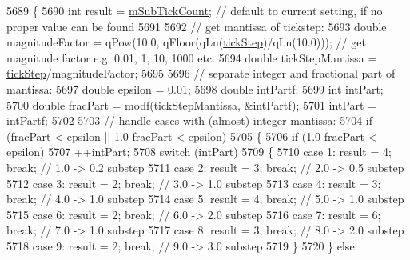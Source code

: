 \begin{DoxyCode}
5689 \{
5690   \textcolor{keywordtype}{int} result = \hyperlink{class_q_c_p_axis_ad70198e6ae2801fc409bc3caec707da9}{mSubTickCount}; \textcolor{comment}{// default to current setting, if no proper value can be found}
5691   
5692   \textcolor{comment}{// get mantissa of tickstep:}
5693   \textcolor{keywordtype}{double} magnitudeFactor = qPow(10.0, qFloor(qLn(\hyperlink{class_q_c_p_axis_a0e6120d24266544441ab691f316a1b03}{tickStep})/qLn(10.0))); \textcolor{comment}{// get magnitude factor
       e.g. 0.01, 1, 10, 1000 etc.}
5694   \textcolor{keywordtype}{double} tickStepMantissa = \hyperlink{class_q_c_p_axis_a0e6120d24266544441ab691f316a1b03}{tickStep}/magnitudeFactor;
5695   
5696   \textcolor{comment}{// separate integer and fractional part of mantissa:}
5697   \textcolor{keywordtype}{double} epsilon = 0.01;
5698   \textcolor{keywordtype}{double} intPartf;
5699   \textcolor{keywordtype}{int} intPart;
5700   \textcolor{keywordtype}{double} fracPart = modf(tickStepMantissa, &intPartf);
5701   intPart = intPartf;
5702   
5703   \textcolor{comment}{// handle cases with (almost) integer mantissa:}
5704   \textcolor{keywordflow}{if} (fracPart < epsilon || 1.0-fracPart < epsilon)
5705   \{
5706     \textcolor{keywordflow}{if} (1.0-fracPart < epsilon)
5707       ++intPart;
5708     \textcolor{keywordflow}{switch} (intPart)
5709     \{
5710       \textcolor{keywordflow}{case} 1: result = 4; \textcolor{keywordflow}{break}; \textcolor{comment}{// 1.0 -> 0.2 substep}
5711       \textcolor{keywordflow}{case} 2: result = 3; \textcolor{keywordflow}{break}; \textcolor{comment}{// 2.0 -> 0.5 substep}
5712       \textcolor{keywordflow}{case} 3: result = 2; \textcolor{keywordflow}{break}; \textcolor{comment}{// 3.0 -> 1.0 substep}
5713       \textcolor{keywordflow}{case} 4: result = 3; \textcolor{keywordflow}{break}; \textcolor{comment}{// 4.0 -> 1.0 substep}
5714       \textcolor{keywordflow}{case} 5: result = 4; \textcolor{keywordflow}{break}; \textcolor{comment}{// 5.0 -> 1.0 substep}
5715       \textcolor{keywordflow}{case} 6: result = 2; \textcolor{keywordflow}{break}; \textcolor{comment}{// 6.0 -> 2.0 substep}
5716       \textcolor{keywordflow}{case} 7: result = 6; \textcolor{keywordflow}{break}; \textcolor{comment}{// 7.0 -> 1.0 substep}
5717       \textcolor{keywordflow}{case} 8: result = 3; \textcolor{keywordflow}{break}; \textcolor{comment}{// 8.0 -> 2.0 substep}
5718       \textcolor{keywordflow}{case} 9: result = 2; \textcolor{keywordflow}{break}; \textcolor{comment}{// 9.0 -> 3.0 substep}
5719     \}
5720   \} \textcolor{keywordflow}{else}

\end{DoxyCode}
